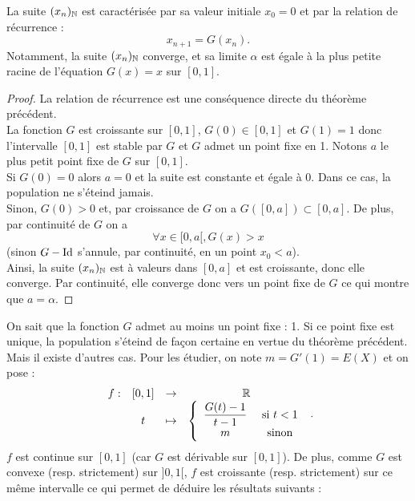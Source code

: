 \begin{thm}
La suite $(x_n)_{\mathbb{N}}$ est caractérisée par sa valeur initiale $x_0=0$ et par la relation de récurrence :
\[ x_{n+1} = G(x_n) . \]
Notamment, la suite $(x_n)_{\mathbb{N}}$ converge, et sa limite $\alpha$ est égale à la plus petite racine de l'équation $G(x) = x$ sur $[0,1]$.
\end{thm}

\begin{proof}
La relation de récurrence est une conséquence directe du théorème précédent. \\
La fonction $G$ est croissante sur $[0,1]$, $G(0) \in [0,1]$ et $G(1) = 1$ donc l'intervalle $[0,1]$ est stable par $G$ 
et $G$ admet un point fixe en 1.
Notons $a$ le plus petit point fixe de $G$ sur $[0,1]$. \\
Si $G(0)=0$ alors $a=0$ et la suite est constante et égale à 0. Dans ce cas, la population ne s'éteind jamais. \\
Sinon, $G(0) > 0$ et, par croissance de $G$ on a $G([0,a]) \subset [0,a]$. De plus, par continuité de $G$ on a 
\[ \forall x \in [0, a[, G(x) > x \]
(sinon $G-\operatorname{Id}$ s'annule, par continuité, en un point $x_0<a$). \\
Ainsi, la suite $(x_n)_{\mathbb{N}}$ est à valeurs dans $[0,a]$ et est croissante, donc elle converge. Par continuité, elle converge donc vers un point
fixe de $G$ ce qui montre que $a = \alpha$.
\end{proof}

On sait que la fonction $G$ admet au moins un point fixe : 1. Si ce point fixe est unique, la population s'éteind de façon certaine en 
vertue du théorème précédent. Mais il existe d'autres cas. Pour les étudier, on note $m=G'(1)=E(X)$ et on pose :
\[ \begin{array}{c c c c}
f : & [0,1] & \to & \mathbb{R} \\
& t & \mapsto & \left \{ \begin{array}{c c} \dfrac{G(t)-1}{t-1} & \text{ si } t < 1 \\ m & \text{ sinon} \end{array} \right.
\end{array} . \]
$f$ est continue sur $[0,1]$ (car $G$ est dérivable sur $[0,1]$). De plus, comme $G$ est convexe (resp. strictement) sur $]0,1[$, 
$f$ est croissante (resp. strictement) sur ce même intervalle ce qui permet de déduire les résultats suivants : 

